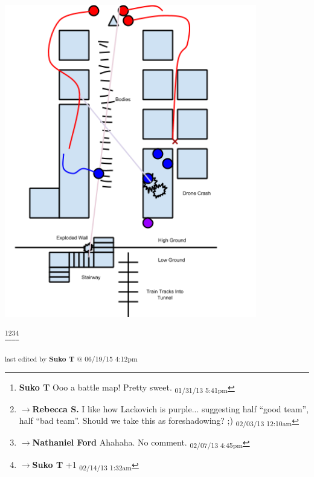 \begin{center}
\includegraphics[width=11cm]{img/ch15_battle_map.png}

\footnote{\textbf{Suko T }Ooo a battle map!  Pretty sweet. \textsubscript{01/31/13 5:41pm}}\footnote{$\rightarrow$\textbf{Rebecca S. }I like how Lackovich is purple... suggesting half ``good team'', half ``bad team''.  Should we take this as foreshadowing? ;) \textsubscript{02/03/13 12:10am}}\footnote{$\rightarrow$\textbf{Nathaniel Ford }Ahahaha. No comment. \textsubscript{02/07/13 4:45pm}}\footnote{$\rightarrow$\textbf{Suko T }+1 \textsubscript{02/14/13 1:32am}}
\end{center}


\vspace{\fill}

\begin{flushright}
\textsubscript{last edited by \textbf{Suko T} @ 06/19/15 4:12pm}
\end{flushright}

